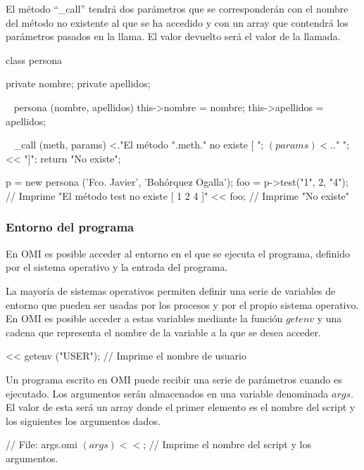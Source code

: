El método ``\_call'' tendrá dos parámetros que se corresponderán con 
el nombre del método no existente al que se ha accedido y 
con un array que contendrá los parámetros pasados en la llama. El valor devuelto
será el valor de la llamada. \\

\begin{myverbatim}
   class persona {
      private nombre;
      private apellidos;
      
      ~ persona (nombre, apellidos) {
         this->nombre = nombre;
         this->apellidos = apellidos;
      }
      
      ~ _call (meth, params) {
         <."El método ".meth." no existe [ ";
         $(params) <.$." ";
         << "]";
         return "No existe";
      }
      
   }
   
   p = new persona ('Fco. Javier', 'Bohórquez Ogalla');
   foo = p->test("1", 2, "4"); // Imprime "El método test no existe [ 1 2 4 ]"
   << foo; // Imprime "No existe"
\end{myverbatim}

\subsubsection{Entorno del programa} \label{sec:environment}

En OMI es posible  acceder al entorno en el que se ejecuta el programa, definido por el sistema 
operativo y la entrada del programa. 

La mayoría de sistemas operativos permiten definir una serie de variables de entorno que pueden ser usadas
por los procesos y por el propio sistema operativo. En OMI es posible acceder a estas variables
mediante la función $getenv$ y una cadena que representa el nombre de la variable a la que se desea acceder. \\

\begin{myverbatim}
   << getenv ("USER"); // Imprime el nombre de usuario 
\end{myverbatim}

Un programa escrito en OMI puede recibir una serie de parámetros cuando es ejecutado. Los argumentos serán almacenados
en una variable denominada $args$. El valor de esta será un array donde el primer elemento es el nombre del script y los siguientes
los argumentos dados. \\

 \begin{myverbatim}
   // File: args.omi
   $(args) << $; // Imprime el nombre del script y los argumentos.
\end{myverbatim}

